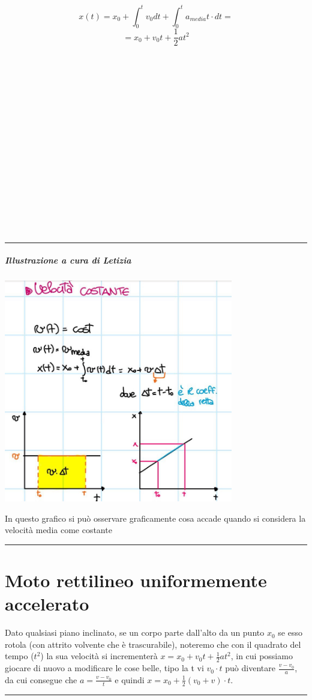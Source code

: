 \documentclass[12pt, a4paper, openany, oneside]{book}
\begin{document}
\[x(t) = x_{0}+\int_{0}^{t}v_{0} dt + \int_{0}^{t} a_{media}t\cdot dt =\]
\[= x_{0} + v_{0}t + \frac{1}{2}at^{2}\]
\\ \\ \\ \\ \\ \\ \\ \\ \\ \\ \\ \\ \\ \\ \\ \\
{\color{black} \rule{\linewidth}{0.3mm} }
\paragraph{Illustrazione a cura di Letizia}
\begin{center}
\includegraphics[width=0.75\textwidth]{vcostante}
\end{center}
In questo grafico si può osservare graficamente cosa accade quando si considera 
la velocità media come costante\\
{\color{black} \rule{\linewidth}{0.3mm} }
\chapter{Moto rettilineo uniformemente accelerato}
Dato qualsiasi piano inclinato, se un corpo parte dall'alto da un punto $x_{0}$
se esso rotola (con attrito volvente che è trascurabile), noteremo che con il
quadrato del tempo ($t^{2}$) la sua velocità si incrementerà
$x = x_{0} + v_{0}t + \frac{1}{2}at^{2}$, in cui possiamo giocare di nuovo a 
modificare le cose belle, tipo la t vi $v_{0}\cdot t$ può diventare 
$\frac{v-v_{0}}{a}$, da cui consegue che $a = \frac{v-v_{0}}{t}$ e quindi 
$x = x_{0} + \frac{1}{2}(v_{0}+v)\cdot t$.\newline
{\color{black} \rule{\linewidth}{0.3mm}}
\end{document}
